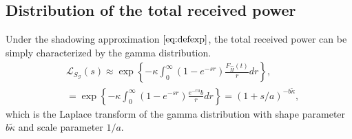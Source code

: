 \documentclass[conference]{IEEEtran}
\theoremstyle{definition}
\theoremstyle{plain}
\begin{document}
            \subsection{Distribution of the total received power}
             Under the shadowing approximation $\eqref{eq:defexp}$, the total received power can be simply characterized by the gamma distribution.
          \begin{align}
            \label{eq:lapexp}
            &\mathcal{L}_{S_{\mathcal{G}}}(s) \approx \exp\left\{-\mathcal{\kappa}\int_0^{\infty}(1-e^{-sr})\frac{F_{\hat{H}}(t)}{r} dr \right\}, \nonumber \\
            &= \exp\left\{-\mathcal{\kappa}\int_0^{\infty}(1-e^{-sr})\frac{e^{-ra}b}{r} dr \right\}=(1+s/a)^{-b\tilde{\kappa}}, 
          \end{align}
          which is the Laplace transform of the gamma distribution with shape parameter $b\tilde{\kappa}$ and scale parameter $1/a$.


          
\end{document}
